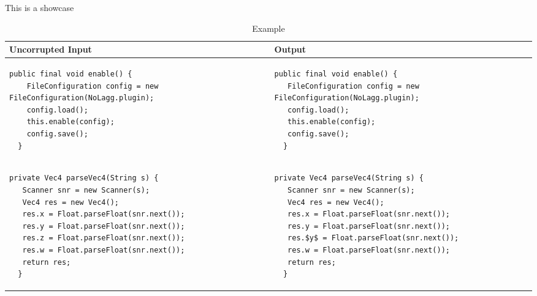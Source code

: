 This is a showcase

\clearpage
\pagestyle{empty}
\begin{landscape}
\begin{table}[p]
\begin{tabular}{ | m{10cm} | m{10cm} | }
  \hline
  Uncorrupted Input & Output \\
  \hline
  {\begin{lstlisting}[style=table]
  public final void enable() {
    FileConfiguration config = new FileConfiguration(NoLagg.plugin);
    config.load();
    this.enable(config);
    config.save();
  }
  \end{lstlisting}} &
  {\begin{lstlisting}[style=table]
  public final void enable() {
   FileConfiguration config = new FileConfiguration(NoLagg.plugin);
   config.load();
   this.enable(config);
   config.save();
  }
  \end{lstlisting}} \\
  \hline
  {\begin{lstlisting}[style=table]
  private Vec4 parseVec4(String s) {
   Scanner snr = new Scanner(s);
   Vec4 res = new Vec4();
   res.x = Float.parseFloat(snr.next());
   res.y = Float.parseFloat(snr.next());
   res.z = Float.parseFloat(snr.next());
   res.w = Float.parseFloat(snr.next());
   return res;
  }
  \end{lstlisting}} &
  {\begin{lstlisting}[style=table]
  private Vec4 parseVec4(String s) {
   Scanner snr = new Scanner(s);
   Vec4 res = new Vec4();
   res.x = Float.parseFloat(snr.next());
   res.y = Float.parseFloat(snr.next());
   res.$y$ = Float.parseFloat(snr.next());
   res.w = Float.parseFloat(snr.next());
   return res;
  }
  \end{lstlisting}} \\
  \hline
\end{tabular}
\caption{Example}
\label{uncorrupted_showcase_table}
\end{table}


\end{landscape}
